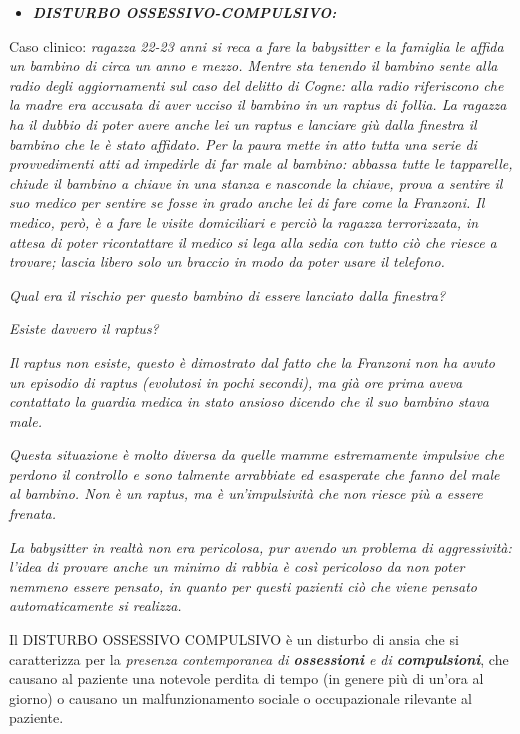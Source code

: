 \documentclass[]{article}
\begin{document}
\begin{itemize}
\item
  \textbf{\emph{DISTURBO OSSESSIVO-COMPULSIVO:}}
\end{itemize}

Caso clinico: \emph{ragazza 22-23 anni si reca a fare la babysitter e la
famiglia le affida un bambino di circa un anno e mezzo. Mentre sta
tenendo il bambino sente alla radio degli aggiornamenti sul caso del
delitto di Cogne: alla radio riferiscono che la madre era accusata di
aver ucciso il bambino in un raptus di follia. La ragazza ha il dubbio
di poter avere anche lei un raptus e lanciare giù dalla finestra il
bambino che le è stato affidato. Per la paura mette in atto tutta una
serie di provvedimenti atti ad impedirle di far male al bambino: abbassa
tutte le tapparelle, chiude il bambino a chiave in una stanza e nasconde
la chiave, prova a sentire il suo medico per sentire se fosse in grado
anche lei di fare come la Franzoni. Il medico, però, è a fare le visite
domiciliari e perciò la ragazza terrorizzata, in attesa di poter
ricontattare il medico si lega alla sedia con tutto ciò che riesce a
trovare; lascia libero solo un braccio in modo da poter usare il
telefono.}

\emph{Qual era il rischio per questo bambino di essere lanciato dalla
finestra?}

\emph{Esiste davvero il raptus?}

\emph{Il raptus non esiste, questo è dimostrato dal fatto che la
Franzoni non ha avuto un episodio di raptus (evolutosi in pochi
secondi), ma già ore prima aveva contattato la guardia medica in stato
ansioso dicendo che il suo bambino stava male.}

\emph{Questa situazione è molto diversa da quelle mamme estremamente
impulsive che perdono il controllo e sono talmente arrabbiate ed
esasperate che fanno del male al bambino. Non è un raptus, ma è
un'impulsività che non riesce più a essere frenata.}

\emph{La babysitter in realtà non era pericolosa, pur avendo un problema
di aggressività: l'idea di provare anche un minimo di rabbia è così
pericoloso da non poter nemmeno essere pensato, in quanto per questi
pazienti ciò che viene pensato automaticamente si realizza.}

Il DISTURBO OSSESSIVO COMPULSIVO è un disturbo di ansia che si
caratterizza per la \emph{presenza contemporanea di \textbf{ossessioni}
e di \textbf{compulsioni}}, che causano al paziente una notevole perdita
di tempo (in genere più di un'ora al giorno) o causano un
malfunzionamento sociale o occupazionale rilevante al paziente.
\end{document}
